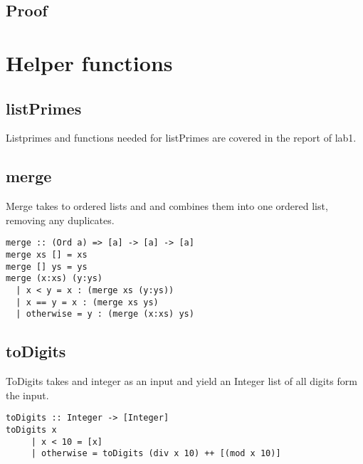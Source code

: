 \documentclass[a4paper,11pt]{article}
\begin{document}
\subsection{Proof}

\section{Helper functions}

\subsection{listPrimes}
Listprimes and functions needed for listPrimes are covered in the report of lab1.

\subsection{merge}

Merge takes to ordered lists and and combines them into one ordered list, removing any duplicates.

\begin{lstlisting}
merge :: (Ord a) => [a] -> [a] -> [a]
merge xs [] = xs
merge [] ys = ys
merge (x:xs) (y:ys)
  | x < y = x : (merge xs (y:ys))
  | x == y = x : (merge xs ys)
  | otherwise = y : (merge (x:xs) ys)
\end{lstlisting}

\subsection{toDigits}

ToDigits takes and integer as an input and yield an Integer list of all digits form the input.

\begin{lstlisting}
toDigits :: Integer -> [Integer]
toDigits x
	 | x < 10 = [x]
	 | otherwise = toDigits (div x 10) ++ [(mod x 10)]
\end{lstlisting}
\end{document}
